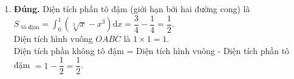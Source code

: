 \begin{ex}
{\begin{enumerate}
			Diện tích  hình phẳng giới hạn bởi hai đồ thị được tính bằng công thức tích phân của (hàm trên trừ hàm dưới).
			 Công thức đúng là $S = \displaystyle\int_0^1 (\sqrt[3]{x} - x^3)\mathrm{d}x$.
			 \item \textbf{Đúng.}
			 Diện tích phần tô đậm (giới hạn bởi hai đường cong) là\\
			$S_{\text{ tô đậm}} 
			= \displaystyle\int_0^1 (\sqrt[3]{x}-x^3)\mathrm{d}x = \dfrac{3}{4}-\dfrac{1}{4}=\dfrac{1}{2}$.\\ 
			Diện tích hình vuông $OABC$ là $1 \times  1 = 1$.\\
			Diện tích phần không  tô đậm = Diện tích hình vuông - Diện tích phần tô đậm $= 1 - \dfrac{1}{2}=\dfrac{1}{2}$.
		\end{enumerate}
	 }
\end{ex}


